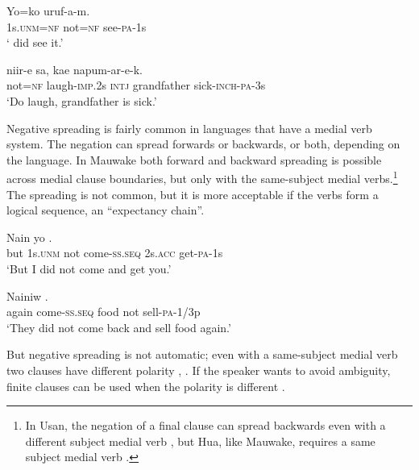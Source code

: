 \ea%
\label{ex:6:x1136}
\gll Yo=ko    uruf-a-m. \\
1s.\textsc{unm}=\textsc{nf}  not=\textsc{nf}  see-\textsc{pa}-1s\\
\glt ` did  see it.'
\z

\ea%
\label{ex:6:x1137}
\gll {}  niir-e  sa,  kae  napum-ar-e-k. \\
not=\textsc{nf}  laugh-\textsc{imp}.2s  \textsc{intj}  grandfather  sick-\textsc{inch}-\textsc{pa}-3s\\
\glt `Do  laugh, grandfather is sick.'
\z

Negative spreading is fairly common in languages that have a medial verb system. The negation can spread forwards or backwards, or both, depending on the language. In Mauwake both forward  and backward  spreading is possible across medial clause boundaries, but only with the same-subject medial verbs.\footnote{In Usan, the negation of a final clause can spread backwards even with a different subject medial verb  \citep[282]{Reesink1987}, but Hua, like Mauwake, requires a same subject medial verb \citep[408]{Haiman1980}.} The spreading is not common, but it is more acceptable if the verbs form a logical sequence, an ``expectancy chain''.

\ea%
\label{ex:6:x1138}
\gll Nain  yo        . \\
but  1s.\textsc{unm}  not  come-\textsc{ss}.\textsc{seq}  2s.\textsc{acc}  get-\textsc{pa}-1s\\
\glt `But I did not come and get you.'
\z

\ea%
\label{ex:6:x1140}
\gll Nainiw        . \\
again  come-\textsc{ss}.\textsc{seq}  food  not  sell-\textsc{pa}-1/3p\\
\glt `They did not come back and sell food again.'
\z

But negative spreading is not automatic; even with a same-subject medial verb two clauses  have different polarity , . If the speaker wants to avoid ambiguity, finite clauses can be used when the polarity is different .

